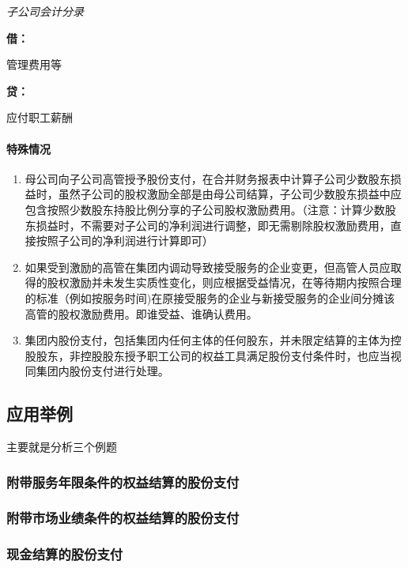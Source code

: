 \documentclass[UTF8,12pt]{ctexart}
\newenvironment{Dr}{%
	\begin{list}{}%
		{
			\setlength{\leftmargin}{2em}
			\setlength{\labelwidth}{2em}
			\setlength{\labelsep}{0pt}
			\setlength{\itemindent}{0pt}
			\setlength{\listparindent}{0pt}
			\setlength{\parsep}{0pt}
			\setlength{\topsep}{0pt}
		}
		\item[\textbf{借：}]
	}{%
	\end{list}
}
\newenvironment{Cr}{%
	\begin{list}{}%
		{
			\setlength{\leftmargin}{2em}
			\setlength{\labelwidth}{2em}
			\setlength{\labelsep}{0pt}
			\setlength{\itemindent}{0pt}
			\setlength{\listparindent}{0pt}
			\setlength{\parsep}{0pt}
			\setlength{\topsep}{0pt}
		}
		\item[\textbf{贷：}]
	}{%
	\end{list}
}
\numberwithin{equation}{section} %
\numberwithin{figure}{section}
\numberwithin{table}{section}
\begin{document}
	\textit{子公司会计分录}
	
	\begin{Dr}
		管理费用等
	\end{Dr}
	\begin{Cr}
		应付职工薪酬
	\end{Cr}
	
	\paragraph{特殊情况}
	\begin{enumerate}
		\item 母公司向子公司高管授予股份支付，在合并财务报表中计算子公司少数股东损益时，虽然子公司的股权激励全部是由母公司结算，子公司少数股东损益中应包含按照少数股东持股比例分享的子公司股权激励费用。（注意：计算少数股东损益时，不需要对子公司的净利润进行调整，即无需剔除股权激励费用，直接按照子公司的净利润进行计算即可）
		
		\item 如果受到激励的高管在集团内调动导致接受服务的企业变更，但高管人员应取得的股权激励并未发生实质性变化，则应根据受益情况，在等待期内按照合理的标准（例如按服务时间)在原接受服务的企业与新接受服务的企业间分摊该高管的股权激励费用。即谁受益、谁确认费用。
		
		\item 集团内股份支付，包括集团内任何主体的任何股东，并未限定结算的主体为控股股东，非控股股东授予职工公司的权益工具满足股份支付条件时，也应当视同集团内股份支付进行处理。
	\end{enumerate}

	
	\subsection{应用举例}
	主要就是分析三个例题
	
	\subsubsection{附带服务年限条件的权益结算的股份支付}
	
	\subsubsection{附带市场业绩条件的权益结算的股份支付}
	
	\subsubsection{现金结算的股份支付}
	
\end{document}
